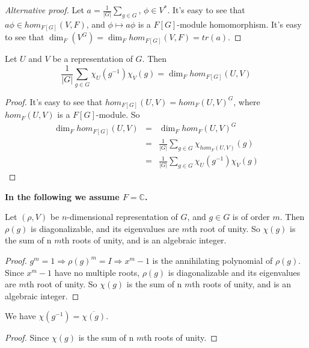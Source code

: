\documentclass[12pt]{book}
\begin{document}
	\begin{proof}[Alternative proof]
		Let $a=\frac 1 {|G|}\sum_{g\in G } $, $\phi\in V^*$. It's easy to see that $a\phi\in hom_{F[G]}(V,F)$, and $\phi\mapsto a\phi$ is a $F[G]$-module homomorphism. It's easy to see that $\dim_F(V^G)=\dim_Fhom_{F[G]}(V,F)=tr (a)$.
	\end{proof}
	
	\begin{theorem}
		Let $U$ and $V$ be a representation of $G$. Then
		\begin{equation}
			\frac 1{|G|}\sum_{g\in G} \chi_U(g^{-1})\chi_V(g)=\dim_F hom_{F[G]}(U,V)
		\end{equation}
	\end{theorem}
	\begin{proof}
		It's easy to see that $hom_{F[G]}(U,V)=hom_{F}(U,V)^{G}$, where $hom_{F}(U,V)$ is a $F[G]$-module. So
		\begin{eqnarray}
			\dim_F hom_{F[G]}(U,V)&=&\dim_F hom_{F}(U,V)^{G}\\
			&=& \frac 1 {|G|}\sum_{g\in G}\chi_{hom_{F}(U,V)}(g)\\
			&=&\frac 1{|G|}\sum_{g\in G} \chi_U(g^{-1})\chi_V(g)
		\end{eqnarray}
	\end{proof}
	
	{\bf In the following we assume $F=\mathbb C$.}
	
	\begin{theorem}
		Let $(\rho,V)$ be $n$-dimensional representation of $G$, and $g\in G$ is of order $m$. Then $\rho(g)$ is diagonalizable, and its eigenvalues are $m$th root of unity. So $\chi(g)$ is the sum of n $m$th roots of unity, and is an algebraic integer.
	\end{theorem}
	\begin{proof}
		$g^m=1\Rightarrow\rho(g)^m=I\Rightarrow x^m-1$ is the annihilating polynomial of $\rho(g)$. Since $x^m-1$ have no multiple roots, $\rho(g)$ is diagonalizable and its eigenvalues are $m$th root of unity. So $\chi(g)$ is the sum of n $m$th roots of unity, and is an algebraic integer.
	\end{proof}
	
	\begin{corollary}
		We have $\chi(g^{-1})=\overline{\chi(g)}$.
	\end{corollary}
	\begin{proof}
		Since $\chi(g)$ is the sum of n $m$th roots of unity.
	\end{proof}
	
\end{document}
